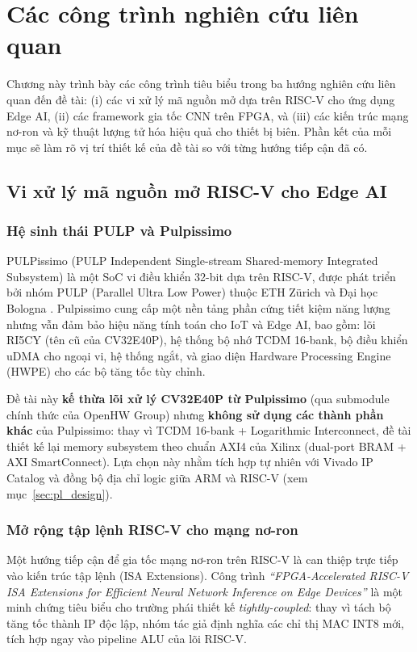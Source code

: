 \chapter {Các công trình nghiên cứu liên quan}
\label{chp:03}

Chương này trình bày các công trình tiêu biểu trong ba hướng nghiên cứu liên quan đến đề tài: (i) các vi xử lý mã nguồn mở dựa trên RISC-V cho ứng dụng Edge AI, (ii) các framework gia tốc CNN trên FPGA, và (iii) các kiến trúc mạng nơ-ron và kỹ thuật lượng tử hóa hiệu quả cho thiết bị biên. Phần kết của mỗi mục sẽ làm rõ vị trí thiết kế của đề tài so với từng hướng tiếp cận đã có.

\section{Vi xử lý mã nguồn mở RISC-V cho Edge AI}
\label{sec:riscv_related}

\subsection{Hệ sinh thái PULP và Pulpissimo}
PULPissimo (PULP Independent Single-stream Shared-memory Integrated Subsystem) là một SoC vi điều khiển 32-bit dựa trên RISC-V, được phát triển bởi nhóm PULP (Parallel Ultra Low Power) thuộc ETH Zürich và Đại học Bologna \cite{pulpissimo}. Pulpissimo cung cấp một nền tảng phần cứng tiết kiệm năng lượng nhưng vẫn đảm bảo hiệu năng tính toán cho IoT và Edge AI, bao gồm: lõi RI5CY (tên cũ của CV32E40P), hệ thống bộ nhớ TCDM 16-bank, bộ điều khiển uDMA cho ngoại vi, hệ thống ngắt, và giao diện Hardware Processing Engine (HWPE) cho các bộ tăng tốc tùy chỉnh.

Đề tài này \textbf{kế thừa lõi xử lý CV32E40P từ Pulpissimo} (qua submodule chính thức của OpenHW Group) nhưng \textbf{không sử dụng các thành phần khác} của Pulpissimo: thay vì TCDM 16-bank + Logarithmic Interconnect, đề tài thiết kế lại memory subsystem theo chuẩn AXI4 của Xilinx (dual-port BRAM + AXI SmartConnect). Lựa chọn này nhằm tích hợp tự nhiên với Vivado IP Catalog và đồng bộ địa chỉ logic giữa ARM và RISC-V (xem mục~\ref{sec:pl_design}).

\subsection{Mở rộng tập lệnh RISC-V cho mạng nơ-ron}
Một hướng tiếp cận để gia tốc mạng nơ-ron trên RISC-V là can thiệp trực tiếp vào kiến trúc tập lệnh (ISA Extensions). Công trình \textit{``FPGA-Accelerated RISC-V ISA Extensions for Efficient Neural Network Inference on Edge Devices''} \cite{parameshwara2025fpga} là một minh chứng tiêu biểu cho trường phái thiết kế \textit{tightly-coupled}: thay vì tách bộ tăng tốc thành IP độc lập, nhóm tác giả định nghĩa các chỉ thị MAC INT8 mới, tích hợp ngay vào pipeline ALU của lõi RISC-V.

